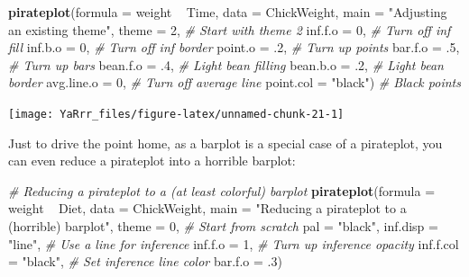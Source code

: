 \documentclass[]{book}
\newenvironment{Shaded}{\begin{snugshade}}{\end{snugshade}}
\newcommand{\KeywordTok}[1]{\textcolor[rgb]{0.13,0.29,0.53}{\textbf{{#1}}}}
\newcommand{\DataTypeTok}[1]{\textcolor[rgb]{0.13,0.29,0.53}{{#1}}}
\newcommand{\DecValTok}[1]{\textcolor[rgb]{0.00,0.00,0.81}{{#1}}}
\newcommand{\StringTok}[1]{\textcolor[rgb]{0.31,0.60,0.02}{{#1}}}
\newcommand{\CommentTok}[1]{\textcolor[rgb]{0.56,0.35,0.01}{\textit{{#1}}}}
\newcommand{\NormalTok}[1]{{#1}}
\theoremstyle{definition}
\theoremstyle{definition}
\theoremstyle{remark}
\begin{document}
\begin{Shaded}
\begin{Highlighting}[]
\KeywordTok{pirateplot}\NormalTok{(}\DataTypeTok{formula =} \NormalTok{weight ~}\StringTok{ }\NormalTok{Time,}
           \DataTypeTok{data =} \NormalTok{ChickWeight,}
           \DataTypeTok{main =} \StringTok{"Adjusting an existing theme"}\NormalTok{,}
           \DataTypeTok{theme =} \DecValTok{2}\NormalTok{,  }\CommentTok{# Start with theme 2}
           \DataTypeTok{inf.f.o =} \DecValTok{0}\NormalTok{, }\CommentTok{# Turn off inf fill}
           \DataTypeTok{inf.b.o =} \DecValTok{0}\NormalTok{, }\CommentTok{# Turn off inf border}
           \DataTypeTok{point.o =} \NormalTok{.}\DecValTok{2}\NormalTok{,   }\CommentTok{# Turn up points}
           \DataTypeTok{bar.f.o =} \NormalTok{.}\DecValTok{5}\NormalTok{, }\CommentTok{# Turn up bars}
           \DataTypeTok{bean.f.o =} \NormalTok{.}\DecValTok{4}\NormalTok{, }\CommentTok{# Light bean filling}
           \DataTypeTok{bean.b.o =} \NormalTok{.}\DecValTok{2}\NormalTok{, }\CommentTok{# Light bean border}
           \DataTypeTok{avg.line.o =} \DecValTok{0}\NormalTok{, }\CommentTok{# Turn off average line}
           \DataTypeTok{point.col =} \StringTok{"black"}\NormalTok{) }\CommentTok{# Black points}
\end{Highlighting}
\end{Shaded}

\begin{center}\texttt{[image: YaRrr\_files/figure-latex/unnamed-chunk-21-1]} \end{center}

Just to drive the point home, as a barplot is a special case of a
pirateplot, you can even reduce a pirateplot into a horrible barplot:

\begin{Shaded}
\begin{Highlighting}[]
\CommentTok{# Reducing a pirateplot to a (at least colorful) barplot}
\KeywordTok{pirateplot}\NormalTok{(}\DataTypeTok{formula =} \NormalTok{weight ~}\StringTok{ }\NormalTok{Diet,}
           \DataTypeTok{data =} \NormalTok{ChickWeight,}
           \DataTypeTok{main =} \StringTok{"Reducing a pirateplot to a (horrible) barplot"}\NormalTok{,}
           \DataTypeTok{theme =} \DecValTok{0}\NormalTok{,                                    }\CommentTok{# Start from scratch}
           \DataTypeTok{pal =} \StringTok{"black"}\NormalTok{,}
           \DataTypeTok{inf.disp =} \StringTok{"line"}\NormalTok{,                            }\CommentTok{# Use a line for inference}
           \DataTypeTok{inf.f.o =} \DecValTok{1}\NormalTok{,                                  }\CommentTok{# Turn up inference opacity}
           \DataTypeTok{inf.f.col =} \StringTok{"black"}\NormalTok{,                          }\CommentTok{# Set inference line color}
           \DataTypeTok{bar.f.o =} \NormalTok{.}\DecValTok{3}\NormalTok{)                                }
\end{Highlighting}
\end{Shaded}
\end{document}
